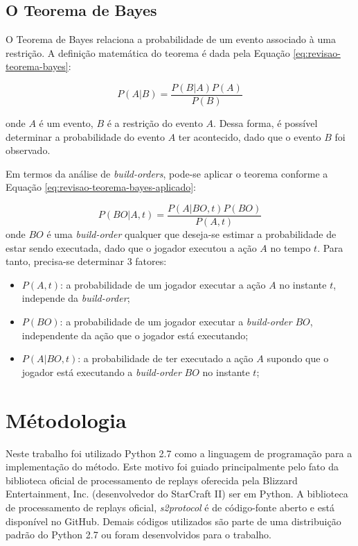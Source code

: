 		\section{O Teorema de Bayes}
O Teorema de Bayes relaciona a probabilidade de um evento associado à uma restrição. A definição matemática do teorema é dada pela Equação \ref{eq:revisao-teorema-bayes}:

\begin{equation}
	P(A|B) = \frac{P(B|A)P(A)}{P(B)}
	\label{eq:revisao-teorema-bayes}
\end{equation}

\noindent onde $A$ é um evento, $B$ é a restrição do evento $A$. Dessa forma, é possível determinar a probabilidade do evento $A$ ter acontecido, dado que o evento $B$ foi observado.

Em termos da análise de \textit{\glspl{build-order}}, pode-se aplicar o teorema conforme a Equação \ref{eq:revisao-teorema-bayes-aplicado}:

\begin{equation}
	P(BO|A, t) = \frac{P(A|BO, t)P(BO)}{P(A, t)}
	\label{eq:revisao-teorema-bayes-aplicado}
\end{equation}
\noindent onde $BO$ é uma \textit{\gls{build-order}} qualquer que deseja-se estimar a probabilidade de estar sendo executada, dado que o jogador executou a ação $A$ no tempo $t$. Para tanto, precisa-se determinar 3 fatores:

\begin{itemize}
	\item $P(A, t)$: a probabilidade de um jogador executar a ação $A$ no instante $t$, independe da \textit{\gls{build-order}};
	\item $P(BO)$: a probabilidade de um jogador executar a \textit{\gls{build-order}} $BO$, independente da ação que o jogador está executando;
	\item $P(A|BO, t)$: a probabilidade de ter executado a ação $A$ supondo que o jogador está executando a \textit{\gls{build-order}} $BO$ no instante $t$;
\end{itemize}

	\chapter{Métodologia}
Neste trabalho foi utilizado Python 2.7 como a linguagem de programação para a implementação do método. Este motivo foi guiado principalmente pelo fato da biblioteca oficial de processamento de \glspl{replay} oferecida pela Blizzard Entertainment, Inc. (desenvolvedor do StarCraft II) ser em Python. A biblioteca de processamento de \glspl{replay} oficial, \textit{s2protocol}\cite{s2protocol} é de código-fonte aberto e está disponível no GitHub. Demais códigos utilizados são parte de uma distribuição padrão do Python 2.7 ou foram desenvolvidos para o trabalho.

